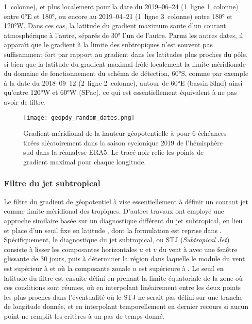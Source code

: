 \documentclass[../main.tex]{subfiles}
\begin{document}
1\iere~colonne), et plus localement pour la date du 2019--06--24 (1\iere~ligne 1\iere~colonne) entre \ang{0}E et \ang{180}, ou encore au 2019--04--21
(1\iere~ligne 3\ieme~colonne) entre \ang{180} et \ang{120}W. Dans ces cas, la latitude du gradient maximum saute d'un courant atmosphérique à l'autre, séparés
de \ang{30} l'un de l'autre. Parmi les autres dates, il apparaît que le gradient à la limite des subtropiques n'est souvent pas suffisamment fort par rapport au
gradient dans les latitudes plus proches du pôle, si bien que la latitude du gradient maximal frôle localement la limite méridionale du domaine de
fonctionnement du schéma de détection, \ang{60}S, comme par exemple à la date du 2018--09--12 (2\ieme~ligne 2\ieme~colonne), autour de \ang{60}E (bassin SInd)
ainsi qu'entre \ang{120}W et \ang{60}W (SPac), ce qui est essentiellement équivalent à ne pas avoir de filtre.
%
\begin{figure}[tb]
    \centering
    \texttt{[image: geopdy\_random\_dates.png]}
    \caption{Gradient méridional de la hauteur géopotentielle à  pour 6 échéances tirées aléatoirement dans la saison cyclonique 2019 de l'hémisphère
    sud dans la réanalyse ERA5. Le tracé noir relie les points de gradient maximal pour chaque longitude.}
    \label{fig:geopdy_random}
\end{figure}

\subsubsection*{Filtre du jet subtropical}

Le filtre du gradient de géopotentiel à  vise essentiellement à définir un courant jet comme limite méridional des tropiques. D'autres travaux ont
employé une approche similaire basée sur un diagnostique différent du jet subtropical, en lieu et place d'un seuil fixe en latitude
\parencite{tory_projected_2013,tory_sea_2015,bell_statistical_2018}, dont la formulation est reprise dans \cite{bourdin_intercomparison_2022}. Spécifiquement,
le diagnostique du jet subtropical, ou STJ (\textit{Subtropical Jet}) consiste à lisser les composantes horizontales $u$ et $v$ du vent à  avec une
fenêtre glissante de 30 jours, puis à déterminer la région dans laquelle le module du vent est supérieur à  et où la composante zonale $u$ est supérieure
à . Le seuil en latitude du filtre est ensuite défini en prenant la limite équatoriale de la zone où ces conditions sont réunies, où en interpolant
linéairement entre les deux points les plus proches dans l'éventualité où le STJ ne serait pas défini sur une tranche de longitude donnée, et en interpolant
temporellement en dernier recours si aucun point ne remplit les critères à un pas de temps donné. 
\end{document}
